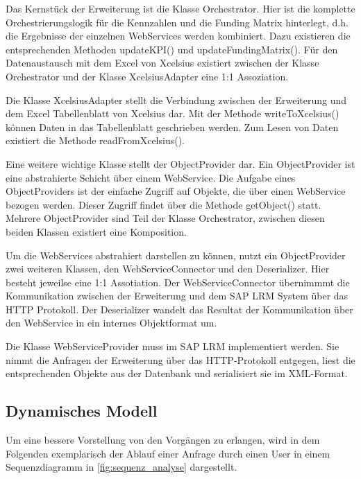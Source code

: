 Das Kernstück der Erweiterung ist die Klasse Orchestrator. Hier ist die komplette Orchestrierungslogik für die Kennzahlen und die Funding Matrix hinterlegt, d.h. die Ergebnisse der einzelnen WebServices werden kombiniert. Dazu existieren die entsprechenden Methoden updateKPI() und updateFundingMatrix(). Für den Datenaustausch mit dem Excel von Xcelsius existiert zwischen der Klasse Orchestrator und der Klasse XcelsiusAdapter eine 1:1 Assoziation.

Die Klasse XcelsiusAdapter stellt die Verbindung zwischen der Erweiterung und dem Excel Tabellenblatt von Xcelsius dar. Mit der Methode writeToXcelsius() können Daten in das Tabellenblatt geschrieben werden. Zum Lesen von Daten existiert die Methode readFromXcelsius().

Eine weitere wichtige Klasse stellt der ObjectProvider dar. Ein ObjectProvider ist eine abstrahierte Schicht über einem WebService. Die Aufgabe eines ObjectProviders ist der einfache Zugriff auf Objekte, die über einen WebService bezogen werden. Dieser Zugriff findet über die Methode getObject() statt. Mehrere ObjectProvider sind Teil der Klasse Orchestrator, zwischen diesen beiden Klassen existiert eine Komposition.

Um die WebServices abstrahiert darstellen zu können, nutzt ein ObjectProvider zwei weiteren Klassen, den WebServiceConnector und den Deserializer. Hier besteht jeweilse eine 1:1 Assotiation. Der WebServiceConnector übernimmmt die Kommunikation zwischen der Erweiterung und dem SAP LRM System über das HTTP Protokoll. Der Deserializer wandelt das Resultat der Kommunikation über den WebService in ein internes Objektformat um.

Die Klasse WebServiceProvider muss im SAP LRM implementiert werden. Sie nimmt die Anfragen der Erweiterung über das HTTP-Protokoll entgegen, liest die entsprechenden Objekte aus der Datenbank und serialisiert sie im XML-Format.

\subsection{Dynamisches Modell}
Um eine bessere Vorstellung von den Vorgängen zu erlangen, wird in dem Folgenden exemplarisch der Ablauf einer Anfrage durch einen User in einem Sequenzdiagramm in \vref{fig:sequenz_analyse} dargestellt.

